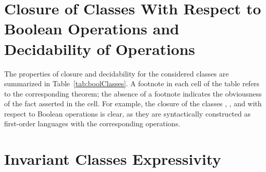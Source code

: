 \section{Closure of Classes With Respect to Boolean Operations and Decidability of Operations}\label{sec:comparison/boolean}


The properties of closure and decidability for the considered classes are summarized in Table~\cref{tab:boolClasses}. A footnote in each cell of the table refers to the corresponding theorem; the absence of a footnote indicates the obviousness of the fact asserted in the cell. For example, the closure of the classes \elemclass{}, \sizeelemclass{}, and \regelemclass{} with respect to Boolean operations is clear, as they are syntactically constructed as first-order languages with the corresponding operations.


\section{Invariant Classes Expressivity}\label{sec:comparison/expressivity}

